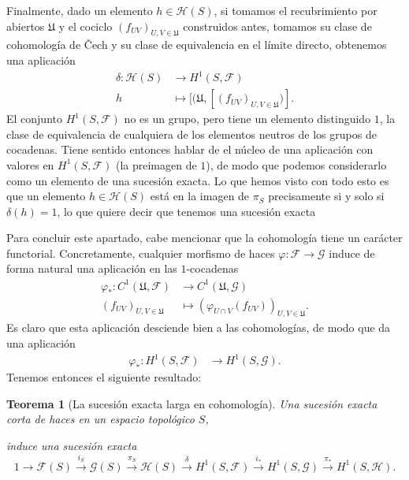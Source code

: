 \documentclass[12pt,a4paper]{article}
\newtheorem{thm}{Teorema}[section]
\theoremstyle{definition} \newtheorem{defn}[thm]{Definición}
\theoremstyle{definition} \newtheorem{ejemplo}[thm]{Ejemplo}
\theoremstyle{definition} \newtheorem{ejercicio}[thm]{Ejercicio}
\def\FF{\mathscr{F}}
\def\GG{\mathscr{G}}
\def\HH{\mathscr{H}}
\def\UU{\mathfrak{U}}
\begin{document}
	    Finalmente, dado un elemento $h\in \HH(S)$, si tomamos el recubrimiento por abiertos $\UU$ y el cociclo $(f_{UV})_{U,V \in \UU}$ construidos antes, tomamos su clase de cohomología de \v{C}ech y su clase de equivalencia en el límite directo, obtenemos una aplicación
	    \begin{align*}
	      \delta :\HH(S) &\longrightarrow H^1(S,\FF)\\ 
	      h &\longmapsto [(\UU,[(f_{UV})_{U,V \in \UU})] .
	      \end{align*}
	      El conjunto $H^1(S,\FF)$ no es un grupo, pero tiene un elemento distinguido $1$, la clase de equivalencia de cualquiera de los elementos neutros de los grupos de cocadenas. Tiene sentido entonces hablar de el núcleo de una aplicación con valores en $H^1(S,\FF)$ (la preimagen de $1$), de modo que podemos considerarlo como un elemento de una sucesión exacta. Lo que hemos visto con todo esto es que un elemento $h\in \HH(S)$ está en la imagen de $\pi_S$ precisamente si y solo si $\delta(h)=1$, lo que quiere decir que tenemos una sucesión exacta
	      \begin{center}
	      \end{center}

	      Para concluir este apartado, cabe mencionar que la cohomología tiene un carácter functorial. Concretamente, cualquier morfismo de haces $\varphi:\FF \rightarrow \GG$ induce de forma natural una aplicación en las $1$-cocadenas
	      \begin{align*}
		\varphi_* :C^1(\UU,\FF) &\longrightarrow C^1(\UU,\GG)\\ 
		(f_{UV})_{U,V\in \UU} &\longmapsto (\varphi_{U\cap V}(f_{UV}) )_{U,V \in \UU}. 
		\end{align*}
		Es claro que esta aplicación desciende bien a las cohomologías, de modo que da una aplicación
		\begin{align*}
		   \varphi_*:H^1(S,\FF) &\longrightarrow H^1(S,\GG).
		  \end{align*}
		  Tenemos entonces el siguiente resultado:

		  \begin{thm}[La sucesión exacta larga en cohomología]
  Una sucesión exacta corta de haces en un espacio topológico $S$,
  \begin{center}
  \end{center}
  induce una sucesión exacta
  $$
  1 \rightarrow \FF(S) \overset{i_S}{\rightarrow} \GG(S) \overset{\pi_S}{\rightarrow}  \HH(S) \overset{\delta}{\rightarrow} H^1(S,\FF) \overset{i_*}{\rightarrow} H^1(S,\GG) \overset{\pi_*}{\rightarrow}  H^1(S,\HH).
      $$
\end{thm}
\end{document}
